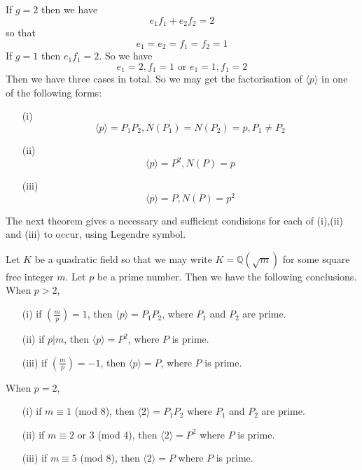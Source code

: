 If $g=2$ then we have
$$e_1f_1+e_2f_2=2$$
so that $$e_1=e_2=f_1=f_2=1$$
If $g=1$ then $e_1f_1=2$. So we have
$$e_1=2,f_1=1 \text{ or } e_1=1,f_1=2$$
Then we have three cases in total. So we may get the factorisation of $\langle p \rangle$ in one of the following forms:
\begin{enumerate}
\item[(i)] $$\langle p \rangle=P_1P_2, N(P_1)=N(P_2)=p,P_1 \neq P_2$$
\item[(ii)] $$\langle p \rangle=P^2, N(P)=p$$
\item[(iii)] $$\langle p \rangle=P, N(P)=p^2$$
\end{enumerate}
The next theorem gives a necessary and sufficient condisions for each of (i),(ii) and (iii) to occur, using Legendre symbol.
\begin{theorem} Let $K$ be a quadratic field so that we may write $K=\mathbb{Q}(\sqrt{m})$ for some square free
integer $m$. Let $p$ be a prime number. Then we have the following conclusions.
When $p>2$,
\begin{enumerate}
\item[(i)] if $(\frac{m}{p})=1$, then $\langle p \rangle=P_1P_2$, where $P_1$ and $P_2$ are prime.
\item[(ii)] if $p|m$, then $\langle p \rangle=P^2$, where $P$ is prime.
\item[(iii)] if $(\frac{m}{p})=-1$, then $\langle p \rangle=P$, where $P$ is prime.
\end{enumerate}
When $p=2$,
\begin{enumerate}
\item[(i)] if $m \equiv 1$ (mod $8$), then $\langle 2 \rangle=P_1P_2$ where $P_1$ and $P_2$ are prime.
\item[(ii)] if $m \equiv 2$ or $3$ (mod $4$), then $\langle 2 \rangle =P^2$ where $P$ is prime.
\item[(iii)] if $m \equiv 5$ (mod $8$), then $\langle 2 \rangle=P$ where $P$ is prime.
\end{enumerate}
\end{theorem}
